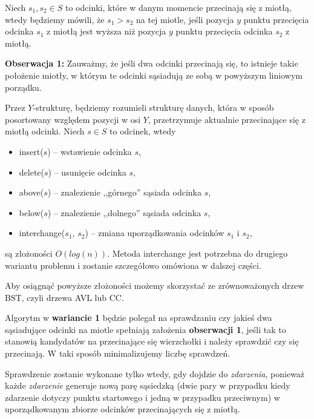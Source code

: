 Niech $s_1, s_2 \in S$ to odcinki, które w danym momencie przecinają się 
z miotłą, wtedy będziemy mówili, że $s_1 > s_2$ na tej miotle,
jeśli pozycja $y$ punktu przecięcia odcinka $s_1$ z miotłą jest wyższa 
niż pozycja $y$ punktu przecięcia odcinka $s_2$ z miotłą.

\textbf{Obserwacja 1:} Zauważmy, że jeśli dwa odcinki przecinają się, to istnieje takie położenie
miotły, w którym te odcinki sąsiadują ze sobą w powyższym liniowym porządku.

Przez $Y$-strukturę, będziemy rozumieli strukturę danych, która w sposób 
posortowany względem pozycji w osi $Y$, przetrzymuje aktualnie przecinające się 
z miotłą odcinki. Niech $s \in S$ to odcinek, wtedy
\begin{itemize}
	\item insert($s$) -- wstawienie odcinka $s$,
	\item delete($s$) -- usunięcie odcinka $s$,
	\item above($s$) -- znalezienie ,,górnego'' sąsiada odcinka $s$,
	\item below($s$) -- znalezienie ,,dolnego'' sąsiada odcinka $s$,
	\item interchange($s_1$, $s_2$) -- zmiana uporządkowania odcinków $s_1$ i $s_2$,
\end{itemize}
są złożoności $O(log(n))$. Metoda interchange jest potrzebna do drugiego wariantu 
problemu i zostanie szczegółowo omówiona w dalszej części.

Aby osiągnąć powyższe złożoności możemy skorzystać ze zrównoważonych drzew BST, czyli
drzewa AVL lub CC.

Algorytm w \textbf{wariancie 1} będzie polegał na sprawdzaniu 
czy jakieś dwa sąsiadujące odcinki na miotle spełniają założenia 
\textbf{obserwacji 1}, jeśli tak to stanowią kandydatów na przecinające 
się wierzchołki i należy sprawdzić czy się przecinają. W taki sposób
minimalizujemy liczbę sprawdzeń.

Sprawdzenie zostanie wykonane tylko wtedy, gdy dojdzie do \textit{zdarzenia},
ponieważ każde \textit{zdarzenie} generuje nową parę sąsiedzką (dwie pary w przypadku kiedy zdarzenie dotyczy punktu startowego i jedną w przypadku przeciwnym) w uporządkowanym zbiorze odcinków przecinających się z miotłą.

